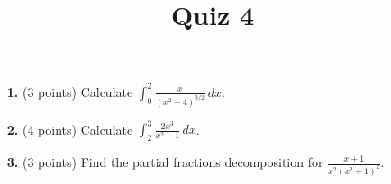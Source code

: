 \documentclass[12pt]{amsart}
\title{Quiz 4}
\begin{document}
\maketitle
\thispagestyle{fancy}

\vskip0.25in
\begin{enumerate}


\item[\textbf{1. }] (3 points) Calculate  $\displaystyle \int_0^2 \frac{x}{(x^2 + 4)^{3/2}} \, dx$.

\vskip 2in

\item[\textbf{2. }](4 points) Calculate  $\displaystyle \int_2^3 \frac {2x^3} {x^2 -1} \, dx$.
 
\vskip 2in

\item[\textbf{3. }] (3 points) Find the partial fractions decomposition for $\displaystyle \frac {x + 1} {x^2(x^2 + 1)^2}$.


\end{enumerate}
\end{document}
